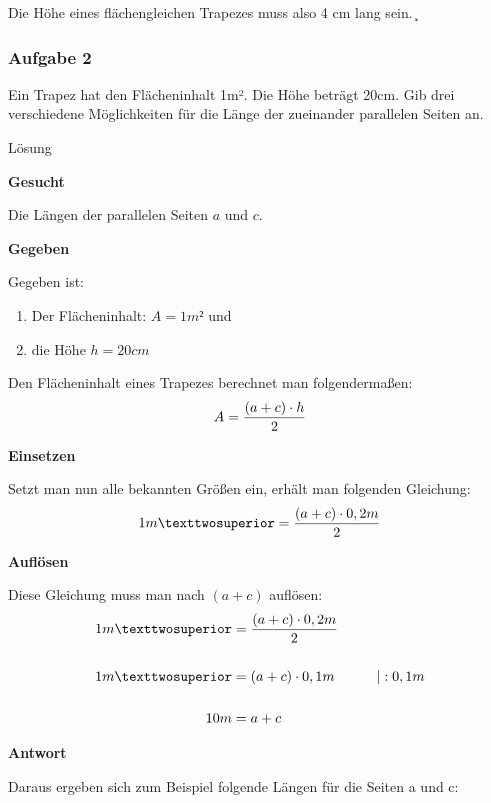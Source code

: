 \documentclass[
  ngerman,
]{book}
\providecommand{\tightlist}{%
  \setlength{\itemsep}{0pt}\setlength{\parskip}{0pt}}
\begin{document}
Die Höhe eines flächengleichen Trapezes muss also 4 cm lang sein.¸

\hypertarget{section-10}{%
\subsubsection*{}\label{section-10}}

\hypertarget{aufgabe-2-3}{%
\subsubsection*{Aufgabe 2}\label{aufgabe-2-3}}

Ein Trapez hat den Flächeninhalt 1m². Die Höhe beträgt 20cm. Gib drei verschiedene Möglichkeiten für die Länge der zueinander parallelen Seiten an.

Lösung

\textbf{Gesucht}

Die Längen der parallelen Seiten \(a\) und \(c\).

\textbf{Gegeben}

Gegeben ist:

\begin{enumerate}
\def\labelenumi{\arabic{enumi}.}
\tightlist
\item
  Der Flächeninhalt: \(A=1m²\) und
\item
  die Höhe \(h=20cm\)
\end{enumerate}

Den Flächeninhalt eines Trapezes berechnet man folgendermaßen:
\[A = {(a+c) \cdot h \over 2}\]

\textbf{Einsetzen}

Setzt man nun alle bekannten Größen ein, erhält man folgenden Gleichung:
\[1 m² = {(a+c) \cdot 0,2 m \over 2}\]

\textbf{Auflösen}

Diese Gleichung muss man nach \((a+c)\) auflösen:
\[\begin{align}1 m² &= {(a+c) \cdot 0,2 m \over 2} \\
{}\\
1 m² &= (a+c) \cdot 0,1 m \quad\quad\quad |:0,1m\\
{}\\
10 m &=a+c
\end{align}\]

\textbf{Antwort}

Daraus ergeben sich zum Beispiel folgende Längen für die Seiten a und c:
\end{document}
